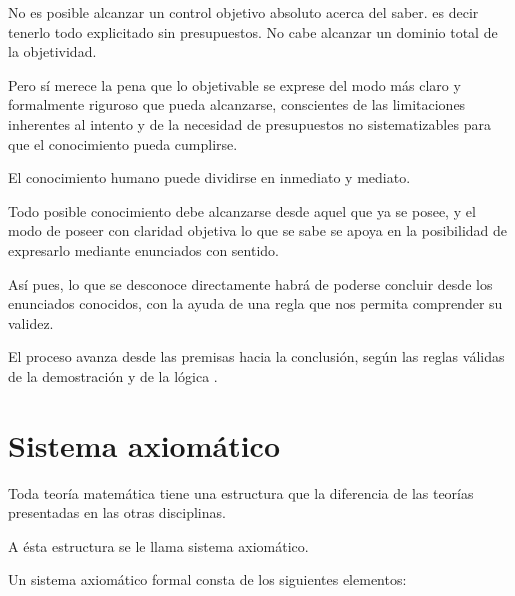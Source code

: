 No es posible alcanzar un control objetivo absoluto acerca del saber.
es decir tenerlo todo explicitado sin presupuestos. No cabe alcanzar
un dominio total de la objetividad.

Pero sí merece la pena que lo objetivable se exprese del modo más
claro y formalmente riguroso que pueda alcanzarse, conscientes de
las limitaciones inherentes al intento y de la necesidad de presupuestos
no sistematizables para que el conocimiento pueda cumplirse. 

El conocimiento humano puede dividirse en inmediato y mediato.

Todo posible conocimiento debe alcanzarse desde aquel que ya se posee,
y el modo de poseer con claridad objetiva lo que se sabe se apoya
en la posibilidad de expresarlo mediante enunciados con sentido.

Así pues, lo que se desconoce directamente habrá de poderse concluir
desde los enunciados conocidos, con la ayuda de una regla que nos
permita comprender su validez.

El proceso avanza desde las premisas hacia la conclusión, según las
reglas válidas de la demostración y de la lógica . 


\section{Sistema axiomático }

Toda teoría matemática tiene una estructura que la diferencia de las
teorías presentadas en las otras disciplinas.

A ésta estructura se le llama \textsf{sistema axiomático.}

Un sistema axiomático formal consta de los siguientes elementos: 

